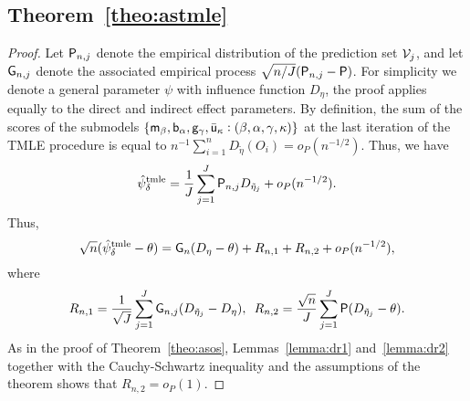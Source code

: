 \subsection{Theorem~\ref{theo:astmle}}
\begin{proof}
  Let $\mathsf{P}_{n,j}$ denote the empirical distribution of the prediction set
  ${\cal V}_j$, and let $\mathsf{G}_{n,j}$ denote the associated empirical process
  $\sqrt{n/J}(\mathsf{P}_{n,j}-\mathsf{P})$. For simplicity we denote a general parameter
  $\psi$ with influence function $D_\eta$, the proof applies equally
  to the direct and indirect effect parameters. By definition, the sum
  of the scores of the submodels
  $\{\mathsf{m}_\beta,\mathsf{b}_\alpha,\mathsf{g}_\gamma,\bar{\mathsf{u}}_\kappa:(\beta,\alpha,
  \gamma, \kappa)\}$ at the last iteration of the TMLE procedure is
  equal to
  $n^{-1}\sum_{i=1}^n D_{\tilde \eta}(O_i) = o_P(n^{-1/2})$. Thus, we have
  \[\hat\psi^{\mbox{\scriptsize tmle}}_\delta = \frac{1}{J}\sum_{j=1}^J\mathsf{P}_{n,j} D_{\tilde \eta_j}+o_P(n^{-1/2}).\]
  Thus,
  \[  \sqrt{n}(\hat\psi^{\mbox{\scriptsize tmle}}_\delta - \theta)=\mathsf{G}_{n} (D_{\eta}
    - \theta) + R_{n,1} + R_{n,2} + o_P(n^{-1/2}),\]
  where
  \[  R_{n,1}  =\frac{1}{\sqrt{J}}\sum_{j=1}^J\mathsf{G}_{n,j}(D_{\tilde
      \eta_j} - D_{\eta}),\,\,\,
    R_{n,2}  = \frac{\sqrt{n}}{J}\sum_{j=1}^J\mathsf{P}(D_{\tilde
      \eta_j}-\theta).
  \]
  As in the proof of Theorem~\ref{theo:asos}, Lemmas~\ref{lemma:dr1}
  and~\ref{lemma:dr2} together with the Cauchy-Schwartz inequality and
  the assumptions of the theorem shows that $R_{n,2}=o_P(1)$.


\end{proof}
